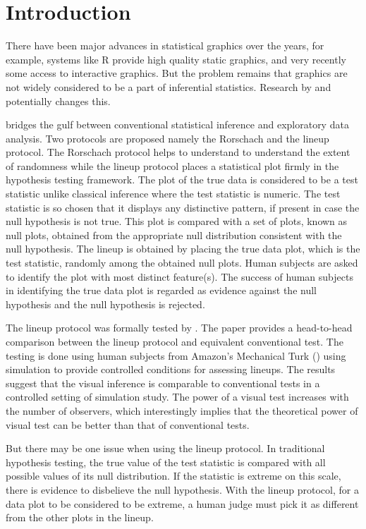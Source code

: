 \documentclass[12]{article}
\begin{document}
\section{Introduction} 
There have been major advances in statistical graphics over the years, for example, systems like R \citep{R} provide high quality static graphics, and very recently some access to interactive graphics. But the problem remains that graphics are not widely considered to be a part of inferential statistics. Research by \citet{gelman:2004} and \citet{buja:2009} 
potentially changes this. 

\citep{buja:2009} bridges the gulf between conventional statistical inference and exploratory data analysis. Two protocols are proposed namely the Rorschach and the lineup protocol. The Rorschach protocol helps to understand to understand the extent of randomness while the lineup protocol places a statistical plot firmly in the hypothesis testing framework. The plot of the true data is considered to be a test statistic unlike classical inference where the test statistic is numeric. The test statistic is so chosen that it displays any distinctive pattern, if present in case the null hypothesis is not true. This plot is compared with a set of plots, known as null plots, obtained from the appropriate null distribution consistent with the null hypothesis. The lineup is obtained by placing the true data plot, which is the test statistic, randomly among the obtained null plots. Human subjects are asked to identify the plot with most distinct feature(s). The success of human subjects in identifying the true data plot is regarded as evidence against the null hypothesis and the null hypothesis is rejected. 

The lineup protocol was formally tested by \cite{majumder:2011}. The paper provides a head-to-head comparison between the lineup protocol and equivalent conventional test. The testing is done using human subjects from Amazon's Mechanical Turk (\cite{turk}) using simulation to provide controlled conditions for assessing lineups. The results suggest that the visual inference is comparable to conventional tests in a controlled setting of simulation study. The power of a visual test increases with the number of observers, which interestingly implies that the theoretical power of visual test can be better than that of conventional tests.

But there may be one issue when using the lineup protocol. In traditional hypothesis testing, the true value of the test statistic is compared with all possible values of its null distribution. If the statistic is extreme on this scale, there is evidence to disbelieve the null hypothesis. With the lineup protocol, for a data plot to be considered to be extreme, a human judge must pick it as different from the other plots in the lineup. 
\end{document}

